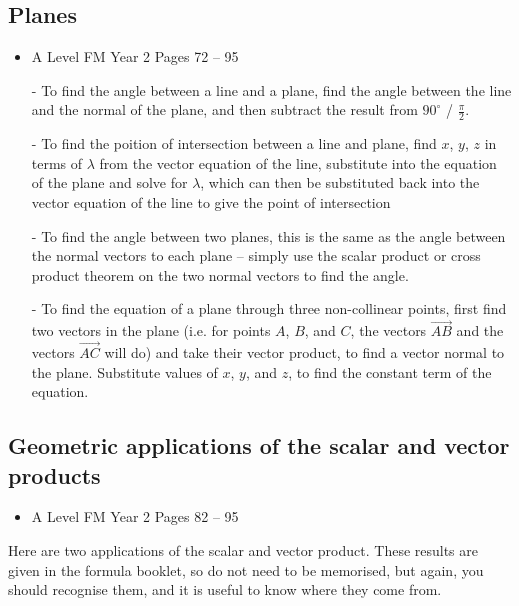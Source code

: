 \documentclass[11pt, a4paper]{article}
\begin{document}
\subsection{Planes}
\begin{itemize}
\item A Level FM Year 2 \hspace{1cm} \phantom{AS /} Pages 72 -- 95
\end{itemize} \par
\begin{itemize}
\item[-] To find the angle between a line and a plane, find the angle between the line and the normal of the plane, and then subtract the result from $90^{\circ}$ / $\frac{\pi}{2}$.
\item[-] To find the poition of intersection between a line and plane, find $x$, $y$, $z$ in terms of $\lambda$ from the vector equation of the line, substitute into the equation of the plane and solve for $\lambda$, which can then be substituted back into the vector equation of the line to give the point of intersection
\item[-] To find the angle between two planes, this is the same as the angle between the normal vectors to each plane -- simply use the scalar product or cross product theorem on the two normal vectors to find the angle.
\item[-] To find the equation of a plane through three non-collinear points, first find two vectors in the plane (i.e. for points $A$, $B$, and $C$, the vectors $\overrightarrow{AB}$ and the vectors $\overrightarrow{AC}$ will do) and take their vector product, to find a vector normal to the plane. Substitute values of $x$, $y$, and $z$, to find the constant term of the equation.
\end{itemize}
\vspace{0.5cm}


\subsection{Geometric applications of the scalar and vector products}
\begin{itemize}
\item A Level FM Year 2 \hspace{1cm} \phantom{AS /} Pages 82 -- 95
\end{itemize} \par
Here are two applications of the scalar and vector product. These results are given in the formula booklet, so do not need to be memorised, but again, you should recognise them, and it is useful to know where they come from.
\end{document}

